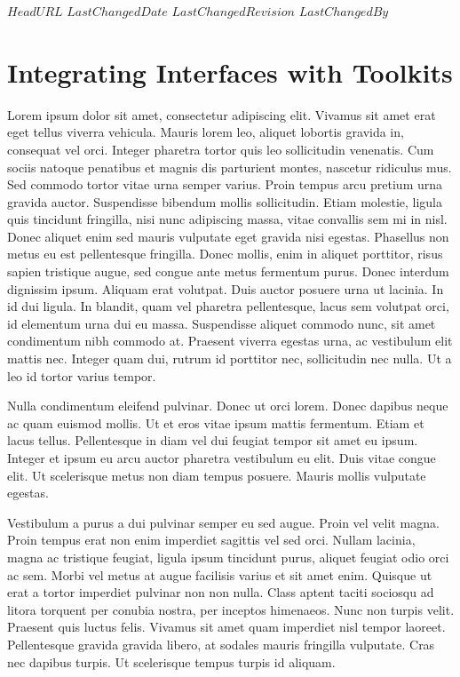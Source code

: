 \svnidlong
{$HeadURL$}
{$LastChangedDate$}
{$LastChangedRevision$}
{$LastChangedBy$}

\chapter{Integrating Interfaces with Toolkits}
Lorem ipsum dolor sit amet, consectetur adipiscing elit.
Vivamus sit amet erat eget tellus viverra vehicula.
Mauris lorem leo, aliquet lobortis gravida in, consequat vel orci.
Integer pharetra tortor quis leo sollicitudin venenatis.
Cum sociis natoque penatibus et magnis dis parturient montes, nascetur ridiculus mus.
Sed commodo tortor vitae urna semper varius.
Proin tempus arcu pretium urna gravida auctor.
Suspendisse bibendum mollis sollicitudin.
Etiam molestie, ligula quis tincidunt fringilla, nisi nunc adipiscing massa, vitae convallis sem mi in nisl.
Donec aliquet enim sed mauris vulputate eget gravida nisi egestas.
Phasellus non metus eu est pellentesque fringilla.
Donec mollis, enim in aliquet porttitor, risus sapien tristique augue, sed congue ante metus fermentum purus.
Donec interdum dignissim ipsum.
Aliquam erat volutpat.
Duis auctor posuere urna ut lacinia.
In id dui ligula.
In blandit, quam vel pharetra pellentesque, lacus sem volutpat orci, id elementum urna dui eu massa.
Suspendisse aliquet commodo nunc, sit amet condimentum nibh commodo at.
Praesent viverra egestas urna, ac vestibulum elit mattis nec.
Integer quam dui, rutrum id porttitor nec, sollicitudin nec nulla.
Ut a leo id tortor varius tempor.

Nulla condimentum eleifend pulvinar.
Donec ut orci lorem.
Donec dapibus neque ac quam euismod mollis.
Ut et eros vitae ipsum mattis fermentum.
Etiam et lacus tellus.
Pellentesque in diam vel dui feugiat tempor sit amet eu ipsum.
Integer et ipsum eu arcu auctor pharetra vestibulum eu elit.
Duis vitae congue elit.
Ut scelerisque metus non diam tempus posuere.
Mauris mollis vulputate egestas.

Vestibulum a purus a dui pulvinar semper eu sed augue.
Proin vel velit magna.
Proin tempus erat non enim imperdiet sagittis vel sed orci.
Nullam lacinia, magna ac tristique feugiat, ligula ipsum tincidunt purus, aliquet feugiat odio orci ac sem.
Morbi vel metus at augue facilisis varius et sit amet enim.
Quisque ut erat a tortor imperdiet pulvinar non non nulla.
Class aptent taciti sociosqu ad litora torquent per conubia nostra, per inceptos himenaeos.
Nunc non turpis velit.
Praesent quis luctus felis.
Vivamus sit amet quam imperdiet nisl tempor laoreet.
Pellentesque gravida gravida libero, at sodales mauris fringilla vulputate.
Cras nec dapibus turpis.
Ut scelerisque tempus turpis id aliquam.

